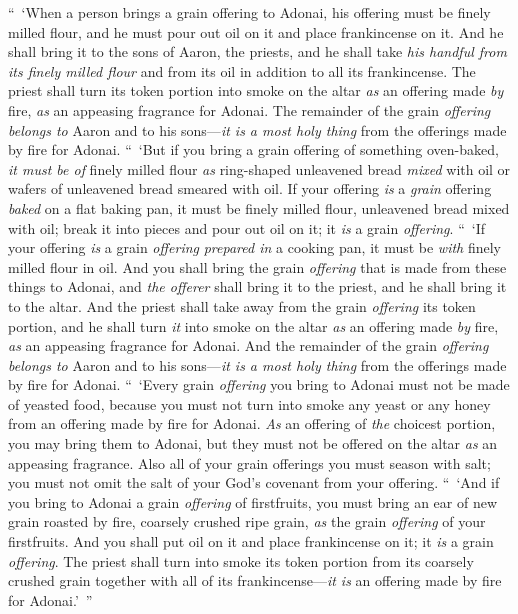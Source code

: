 \begin{biblechapter} %
 “ ‘When a person brings a grain offering to Adonai, his offering must be finely milled flour, and he must pour out oil on it and place frankincense on it.
\verse And he shall bring it to the sons of Aaron, the priests, and he shall take \textit{his handful from its finely milled flour} and from its oil in addition to all its frankincense. The priest shall turn its token portion into smoke on the altar \textit{as} an offering made \textit{by} fire, \textit{as} an appeasing fragrance for Adonai.
\verse The remainder of the grain \textit{offering} \textit{belongs to} Aaron and to his sons—\textit{it is a most holy thing} from the offerings made by fire for Adonai.
\verse “ ‘But if you bring a grain offering of something oven-baked, \textit{it must be of} finely milled flour \textit{as} ring-shaped unleavened bread \textit{mixed} with oil or wafers of unleavened bread smeared with oil.
\verse If your offering \textit{is} a \textit{grain} offering \textit{baked} on a flat baking pan, it must be finely milled flour, unleavened bread mixed with oil;
\verse break it into pieces and pour out oil on it; it \textit{is} a grain \textit{offering}.
\verse “ ‘If your offering \textit{is} a grain \textit{offering} \textit{prepared in} a cooking pan, it must be \textit{with} finely milled flour in oil.
\verse And you shall bring the grain \textit{offering} that is made from these things to Adonai, and \textit{the offerer} shall bring it to the priest, and he shall bring it to the altar.
\verse And the priest shall take away from the grain \textit{offering} its token portion, and he shall turn \textit{it} into smoke on the altar \textit{as} an offering made \textit{by} fire, \textit{as} an appeasing fragrance for Adonai.
\verse And the remainder of the grain \textit{offering} \textit{belongs to} Aaron and to his sons—\textit{it is a most holy thing} from the offerings made by fire for Adonai.
\verse “ ‘Every grain \textit{offering} you bring to Adonai must not be made of yeasted food, because you must not turn into smoke any yeast or any honey from an offering made by fire for Adonai.
\verse \textit{As} an offering of \textit{the} choicest portion, you may bring them to Adonai, but they must not be offered on the altar \textit{as} an appeasing fragrance.
\verse Also all of your grain offerings you must season with salt; you must not omit the salt of your God’s covenant from your offering.
\verse “ ‘And if you bring to Adonai a grain \textit{offering} of firstfruits, you must bring an ear of new grain roasted by fire, coarsely crushed ripe grain, \textit{as} the grain \textit{offering} of your firstfruits.
\verse And you shall put oil on it and place frankincense on it; it \textit{is} a grain \textit{offering}.
\verse The priest shall turn into smoke its token portion from its coarsely crushed grain together with all of its frankincense—\textit{it is} an offering made by fire for Adonai.’ ”
\end{biblechapter}

